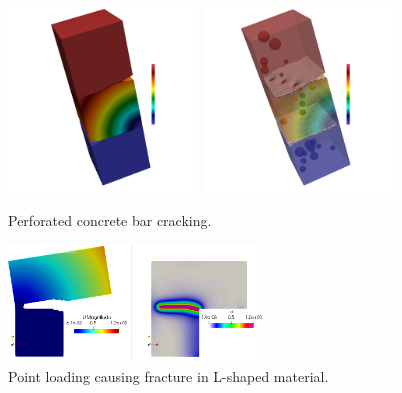 \begin{figure}
    \centering
    \includegraphics[width=0.45\textwidth]{./Images/rainbow-test.png}    \includegraphics[width=0.45\textwidth]{./Images/rainbow-test1.png}
    \caption{Perforated concrete bar cracking.}
    \label{fig:rainbow}
\end{figure}

\begin{figure}
	\centering
	\includegraphics[width=0.6\textwidth]{./Images/fract-1.png}
	\caption{Point loading causing fracture in L-shaped material.}
	\label{fig:fract-1}
\end{figure}

